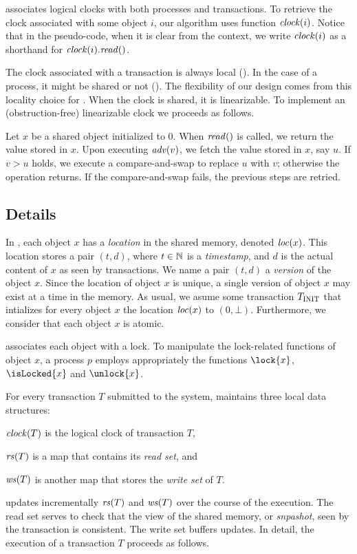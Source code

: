  associates logical clocks with both processes and transactions.
To retrieve the clock associated with some object $i$, our algorithm uses function $\clockOf{i}$.
Notice that in the pseudo-code, when it is clear from the context, 
we write $\clockOf{i}$ as a shorthand for $\clockOf{i}.\mathit{read}()$.

The clock associated with a transaction is always local ().
In the case of a process, it might be shared or not ().
The flexibility of our design comes from this locality choice for .
When the clock is shared, it is linearizable.
To implement an (obstruction-free) linearizable clock we proceeds as follows.
\begin{construction}
  Let $x$ be a shared object initialized to $0$.
  When $\cread$ is called, we return the value stored in $x$.
  Upon executing $\cadv(v)$, we fetch the value stored in $x$, say $u$.
  If $v > u$ holds, we execute a compare-and-swap to replace $u$ with $v$; 
  otherwise the operation returns.
  If the compare-and-swap fails, the previous steps are retried.
\end{construction}



\subsection{Details}

In , each object $x$ has a \emph{location} in the shared memory, denoted $\locationOf{x}$.
This location stores a pair $(t,d)$, where $t \in \naturalSet$ is a \emph{timestamp}, and $d$ is the actual content of $x$ as seen by transactions.
We name a pair $(t,d)$ a \emph{version} of the object $x$.
Since the location of object $x$ is unique, a single version of object $x$ may exist at a time in the memory.
As usual, we asume some transaction $\transInit$ that intializes for every object $x$ the location $\locationOf{x}$ to $(0,\bot)$.
Furthermore, we consider that each object $x$ is atomic.

 associates each object with a lock.
To manipulate the lock-related functions of object $x$, 
a process $p$ employs appropriately the functions $\lock{x}$, $\isLocked{x}$ and $\unlock{x}$.

For every transaction $T$ submitted to the system,  maintains three local data structures:
\begin{inparaenum}[]
\item $\clockOf{T}$ is the logical clock of transaction $T$,
\item $\readSetOf{T}$ is a map that contains its \emph{read set}, and 
\item $\writeSetOf{T}$ is another map that stores the \emph{write set} of $T$.
\end{inparaenum}
 updates incrementally $\readSetOf{T}$ and $\writeSetOf{T}$ over the course of the execution.
The read set serves to check that the view of the shared memory, or \emph{snpashot}, seen by the transaction is consistent.
The write set buffers updates.
In detail, the execution of a transaction $T$ proceeds as follows.

